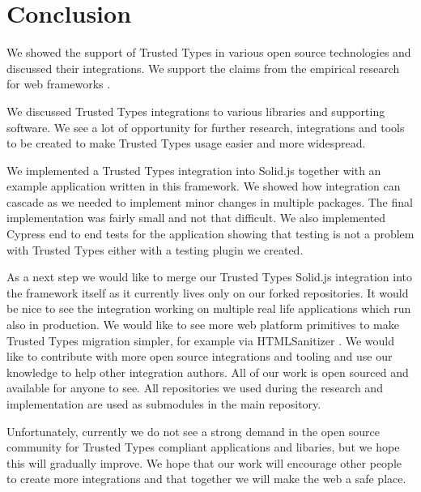 \chapter{Conclusion}


We showed the support of Trusted Types in various open source technologies and discussed their
integrations. We support the claims from the empirical research for web frameworks
\cite{tt_web_framework_paper}.

We discussed Trusted Types integrations to various libraries and supporting software. We see a lot
of opportunity for further research, integrations and tools to be created to make Trusted Types
usage easier and more widespread.

We implemented a Trusted Types integration into Solid.js together with an example application
written in this framework. We showed how integration can cascade as we needed to implement minor
changes in multiple packages. The final implementation was fairly small and not that difficult. We
also implemented Cypress end to end tests for the application showing that testing is not a problem
with Trusted Types either with a testing plugin we created.

As a next step we would like to merge our Trusted Types Solid.js integration into the framework
itself as it currently lives only on our forked repositories. It would be nice to see the
integration working on multiple real life applications which run also in production. We would like
to see more web platform primitives to make Trusted Types migration simpler, for example via
HTMLSanitizer \cite{tt_report_mid2021}. We would like to contribute with more open source
integrations and tooling and use our knowledge to help other integration authors. All of our work is
open sourced and available for anyone to see. All repositories we used during the research and
implementation are used as submodules in the main repository.

Unfortunately, currently we do not see a strong demand in the open source community for Trusted
Types compliant applications and libaries, but we hope this will gradually improve. We hope that our
work will encourage other people to create more integrations and that together we will make the web
a safe place.
